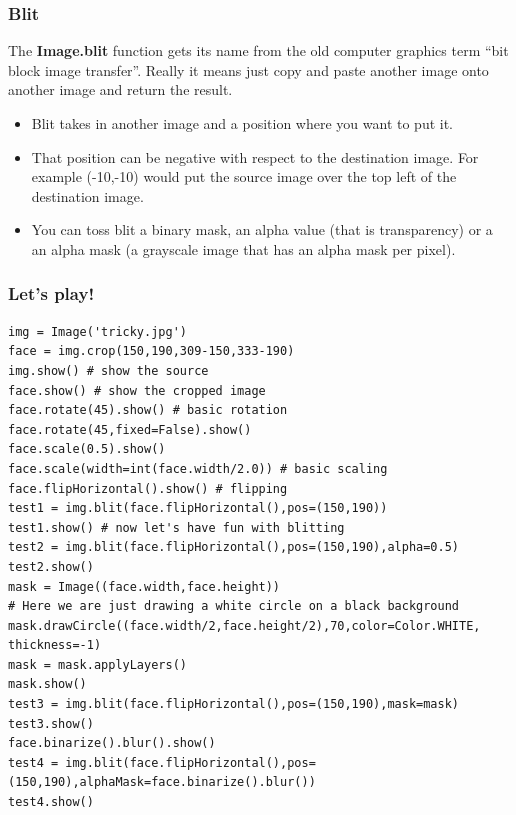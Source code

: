 \documentclass{beamer}
\begin{document}
\begin{frame}
\frametitle{Blit}
The \textbf{Image.blit} function gets its name from the old computer graphics term ``bit block image
transfer''. Really it means just copy and paste another image onto
another image and return the result.
\begin{itemize}
\item Blit takes in another image and a position where you want to put
  it.
\item That position can be negative with respect to the destination
  image. For example (-10,-10) would put the source image over the top
  left of the destination image.
\item You can toss blit a binary mask, an alpha value (that is
  transparency) or a an alpha mask (a grayscale image that has an
  alpha mask per pixel).
\end{itemize}
\end{frame}
\begin{frame}[fragile] 
\frametitle{Let's play!}
\begin{example}
\begin{verbatim}
img = Image('tricky.jpg')
face = img.crop(150,190,309-150,333-190)
img.show() # show the source
face.show() # show the cropped image
face.rotate(45).show() # basic rotation
face.rotate(45,fixed=False).show()
face.scale(0.5).show()
face.scale(width=int(face.width/2.0)) # basic scaling
face.flipHorizontal().show() # flipping
test1 = img.blit(face.flipHorizontal(),pos=(150,190))
test1.show() # now let's have fun with blitting
test2 = img.blit(face.flipHorizontal(),pos=(150,190),alpha=0.5)
test2.show() 
mask = Image((face.width,face.height))
# Here we are just drawing a white circle on a black background
mask.drawCircle((face.width/2,face.height/2),70,color=Color.WHITE, thickness=-1)
mask = mask.applyLayers()
mask.show()
test3 = img.blit(face.flipHorizontal(),pos=(150,190),mask=mask)
test3.show()
face.binarize().blur().show()
test4 = img.blit(face.flipHorizontal(),pos=(150,190),alphaMask=face.binarize().blur())
test4.show()
\end{verbatim}
\end{example}
\end{frame}
\end{document}
